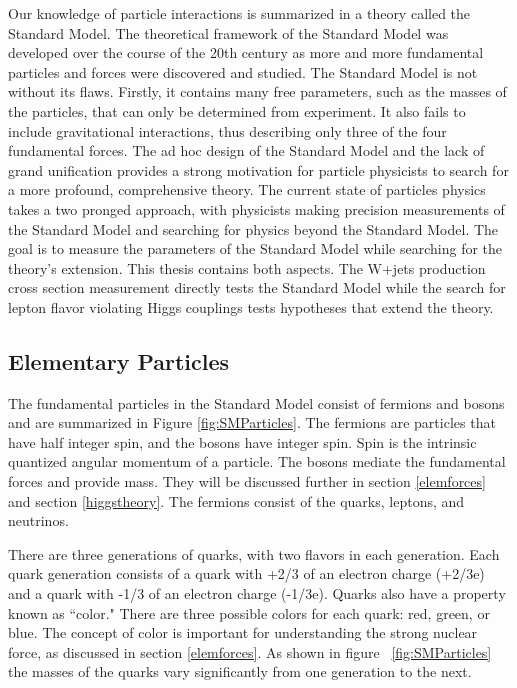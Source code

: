 \documentclass[oneside, letterpaper, oldfontcommands]{memoir}
\begin{document}
\qquad Our knowledge of particle interactions is summarized in a theory called the Standard Model. The theoretical framework of the Standard Model was developed over the course of the 20th century as more and more fundamental particles and forces were discovered and studied. The Standard Model is not without its flaws. Firstly, it contains many free parameters, such as the masses of the particles, that can only be determined from experiment. It also fails to include gravitational interactions, thus describing only three of the four fundamental forces. The ad hoc design of the Standard Model and the lack of grand unification provides a strong motivation for particle physicists to search for a more profound, comprehensive theory. The current state of particles physics takes a two pronged approach, with physicists making precision measurements of the Standard Model and searching for physics beyond the Standard Model. The goal is to measure the parameters of the Standard Model while searching for the theory's extension. This thesis contains both aspects. The W+jets production cross section measurement directly tests the Standard Model while the search for lepton flavor violating Higgs couplings tests hypotheses that extend the theory.

\subsection{Elementary Particles}\label{elemparticles}
\qquad The fundamental particles in the Standard Model consist of fermions and bosons and are summarized in Figure \ref{fig:SMParticles}. The fermions are particles that have half integer spin, and the bosons have integer spin. Spin is the intrinsic quantized angular momentum of a particle. The bosons mediate the fundamental forces and provide mass. They will be discussed further in section \ref{elemforces} and section \ref{higgstheory}. The fermions consist of the quarks, leptons, and neutrinos. 

\qquad There are three generations of quarks, with two flavors in each generation. Each quark generation consists of a quark with +2/3 of an electron charge (+2/3e) and a quark with -1/3 of an electron charge (-1/3e). Quarks also have a property known as ``color." There are three possible colors for each quark: red, green, or blue. The concept of color is important for understanding the strong nuclear force, as discussed in section \ref{elemforces}. As shown in figure ~\ref{fig:SMParticles} the masses of the quarks vary significantly from one generation to the next.
\end{document}
